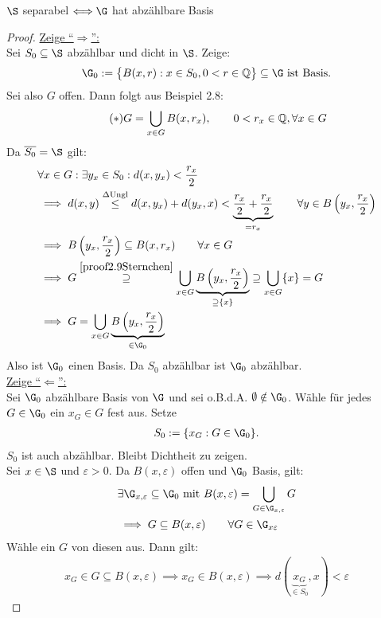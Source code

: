 \begin{satz}\label{satz2.9}
$\S$ separabel $\Longleftrightarrow\G$ hat abzählbare Basis
\end{satz}
\begin{proof}
\underline{Zeige ``$\Rightarrow$'':}\\
Sei $S_0\subseteq\S$ abzählbar und dicht in $\S$. Zeige:
\begin{align*}
\G_0:=\big\lbrace B(x,r):x\in S_0,0<r\in\Q\big\rbrace\subseteq\G\text{ ist Basis.}
\end{align*}
Sei also $G$ offen. Dann folgt aus Beispiel 2.8:
\begin{align}\label{proof2.9Sternchen}\tag{$\ast$}
G=\bigcup\limits_{x\in G} B(x,r_x),\qquad 0<r_x\in\mathbb{Q},\forall x\in G
\end{align}
Da $\overline{S_0}=\S$ gilt:
\begin{align*}
&\forall x\in G:\exists y_x\in S_0: d(x,y_x)<\frac{r_x}{2}\\
&\implies d(x,y)
\stackrel{\Delta\text{Ungl}}{\leq}
d(x,y_x)+d(y_x,x)< \underbrace{\frac{r_x}{2}+\frac{r_x}{2}}_{=r_x}\qquad\forall y\in B\left(y_x,\frac{r_x}{2}\right)\\
&\implies B\left(y_x,\frac{r_x}{2}\right)\subseteq B(x,r_x)\qquad\forall x\in G\\
&\implies G\stackrel{\eqref{proof2.9Sternchen}}{\supseteq}
\bigcup\limits_{x\in G}\underbrace{B\left(y_x,\frac{r_x}{2}\right)}_{\supseteq\lbrace x\rbrace}
\supseteq\bigcup\limits_{x\in G}\lbrace x\rbrace=G\\
&\implies G=\bigcup	\limits_{x\in G}\underbrace{B\left(y_x,\frac{r_x}{2}\right)}_{\in\G_0}
\end{align*}
Also ist $\G_0$ einen Basis. Da $S_0$ abzählbar ist $\G_0$ abzählbar.\\

\underline{Zeige ``$\Leftarrow$'':}\\
Sei $\G_0$ abzählbare Basis von $\G$ und sei o.B.d.A. $\emptyset\notin\G_0$. Wähle für jedes $G\in\G_0$ ein $x_G\in G$ fest aus. Setze
\begin{align*}
S_0:=\lbrace x_G:G\in\G_0\rbrace.
\end{align*}
$S_0$ ist auch abzählbar. Bleibt Dichtheit zu zeigen.\\
Sei $x\in\S$ und $\varepsilon>0$. Da $B(x,\varepsilon)$ offen und $\G_0$ Basis, gilt: 
\begin{align*}
&\exists\G_{x,\varepsilon}\subseteq\G_0\mit B(x,\varepsilon)=\bigcup\limits_{G\in\G_{x,\varepsilon}} G\\
&\implies G\subseteq B(x,\varepsilon)\qquad\forall G\in\G_{x\varepsilon}
\end{align*}
Wähle ein $G$ von diesen aus. Dann gilt:
\begin{align*}
x_G\in G\subseteq B(x,\varepsilon)
\implies x_G\in B(x,\varepsilon)
\implies d(\underbrace{x_G}_{\in S_0},x)<\varepsilon
\end{align*}
\end{proof}

